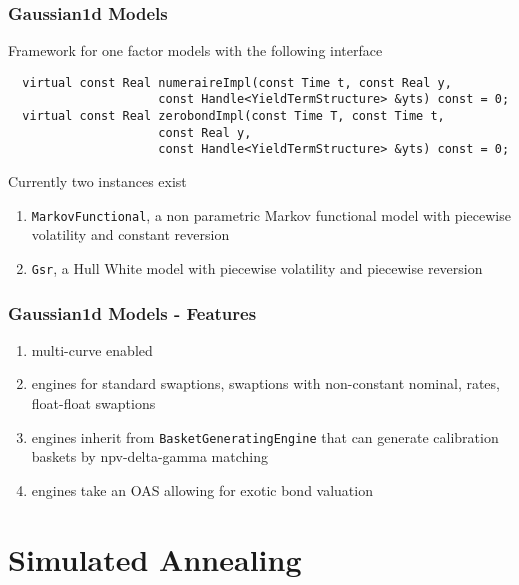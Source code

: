 \documentclass{beamer}
\begin{document}
\begin{frame}[fragile]
\frametitle{Gaussian1d Models}
Framework for one factor models with the following interface

\begin{verbatim}
  virtual const Real numeraireImpl(const Time t, const Real y,
                     const Handle<YieldTermStructure> &yts) const = 0;
  virtual const Real zerobondImpl(const Time T, const Time t, 
                     const Real y,
                     const Handle<YieldTermStructure> &yts) const = 0;
\end{verbatim}

Currently two instances exist

\begin{enumerate}
\item \verb+MarkovFunctional+, a non parametric Markov functional model with piecewise volatility and constant reversion
\item \verb+Gsr+, a Hull White model with piecewise volatility and piecewise reversion
\end{enumerate}
\end{frame}


\begin{frame}[fragile]
\frametitle{Gaussian1d Models - Features}
\begin{enumerate}
\item multi-curve enabled
\item engines for standard swaptions, swaptions with non-constant nominal, rates, float-float swaptions
\item engines inherit from \verb+BasketGeneratingEngine+ that can generate calibration baskets by npv-delta-gamma matching
\item engines take an OAS allowing for exotic bond valuation
\end{enumerate}

\end{frame}





\section{Simulated Annealing}

\end{document}
